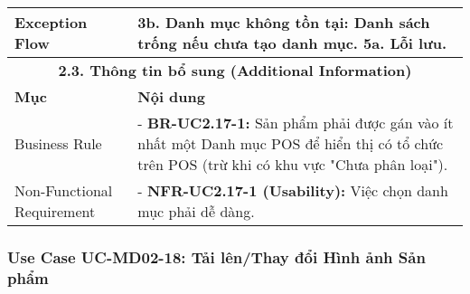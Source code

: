 \begin{longtable}{|m{4cm}|p{11cm}|}
\hline
Exception Flow & \textbf{3b. Danh mục không tồn tại:} Danh sách trống nếu chưa tạo danh mục. \newline \textbf{5a. Lỗi lưu.} \\
\hline
\multicolumn{2}{|c|}{\textbf{2.3. Thông tin bổ sung (Additional Information)}} \\
\hline
\textbf{Mục} & \textbf{Nội dung} \\
\hline
Business Rule & - \textbf{BR-UC2.17-1:} Sản phẩm phải được gán vào ít nhất một Danh mục POS để hiển thị có tổ chức trên POS (trừ khi có khu vực "Chưa phân loại"). \\
\hline
Non-Functional Requirement & - \textbf{NFR-UC2.17-1 (Usability):} Việc chọn danh mục phải dễ dàng. \\
\hline
\end{longtable}

\subsubsection{Use Case UC-MD02-18: Tải lên/Thay đổi Hình ảnh Sản phẩm}

